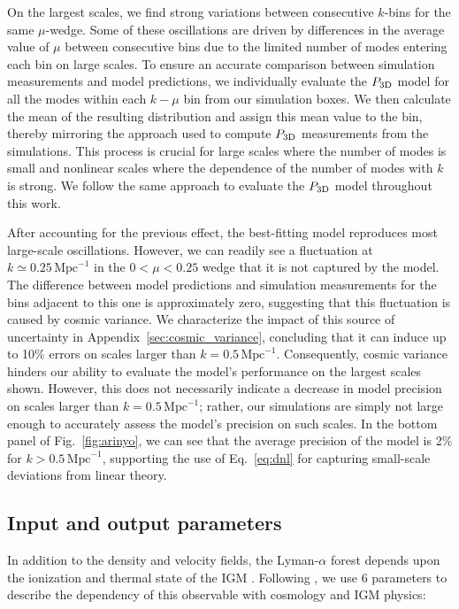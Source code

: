 \documentclass{aa}
\newcommand{\lyaf}{Lyman-$\alpha$ forest\xspace}
\newcommand{\pthreed}{\ensuremath{P_{\rm 3D}}\xspace}
\newcommand{\iMpc}{\ensuremath{\,\mathrm{Mpc}^{-1}}}
\begin{document}
On the largest scales, we find strong variations between consecutive $k$-bins for the same $\mu$-wedge. Some of these oscillations are driven by differences in the average value of $\mu$ between consecutive bins due to the limited number of modes entering each bin on large scales. To ensure an accurate comparison between simulation measurements and model predictions, we individually evaluate the \pthreed model for all the modes within each $k-\mu$ bin from our simulation boxes. We then calculate the mean of the resulting distribution and assign this mean value to the bin, thereby mirroring the approach used to compute \pthreed measurements from the simulations. This process is crucial for large scales where the number of modes is small and nonlinear scales where the dependence of the number of modes with $k$ is strong. We follow the same approach to evaluate the \pthreed model throughout this work.

After accounting for the previous effect, the best-fitting model reproduces most large-scale oscillations. However, we can readily see a fluctuation at $k\simeq0.25\iMpc$ in the $0<\mu<0.25$ wedge that it is not captured by the model. The difference between model predictions and simulation measurements for the bins adjacent to this one is approximately zero, suggesting that this fluctuation is caused by cosmic variance. We characterize the impact of this source of uncertainty in Appendix~\ref{sec:cosmic_variance}, concluding that it can induce up to 10\% errors on scales larger than $k=0.5\iMpc$. Consequently, cosmic variance hinders our ability to evaluate the model's performance on the largest scales shown. However, this does not necessarily indicate a decrease in model precision on scales larger than $k=0.5\iMpc$; rather, our simulations are simply not large enough to accurately assess the model's precision on such scales. In the bottom panel of Fig.~\ref{fig:arinyo}, we can see that the average precision of the model is 2\% for $k>0.5\iMpc$, supporting the use of Eq.~\ref{eq:dnl} for capturing small-scale deviations from linear theory.


\subsection{Input and output parameters}
\label{sec:strategy_params}

In addition to the density and velocity fields, the \lyaf depends upon the ionization and thermal state of the IGM \citep[e.g.;][]{mcdonald2003MeasurementCosmologicalGeometry}. Following \citet{Pedersen2021}, we use 6 parameters to describe the dependency of this observable with cosmology and IGM physics:
\end{document}
